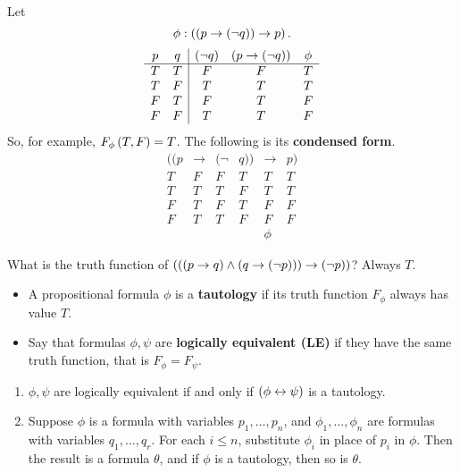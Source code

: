 \begin{example*}
Let
$$ \phi : \left( \left( p \rightarrow \left( \neg q \right) \right) \rightarrow p \right). $$
$$
\begin{array}{cc|ccc}
p & q & \left( \neg q \right) & \left( p \rightarrow \left( \neg q \right) \right) & \phi \\
\hline
T & T & F & F & T \\
T & F & T & T & T \\
F & T & F & T & F \\
F & F & T & T & F
\end{array}
$$
So, for example, $ F_\phi\left( T, F \right) = T $. The following is its \textbf{condensed form}.
$$
\begin{array}{rcrlcl}
((p & \rightarrow & (\neg & q)) & \rightarrow & p) \\
\hline
T & F & F & T & T & T \\
T & T & T & F & T & T \\
F & T & F & T & F & F \\
F & T & T & F & F & F \\
& & & & \phi &
\end{array}
$$
\end{example*}


\begin{example*}
What is the truth function of $ \left( \left( \left( p \rightarrow q \right) \land \left( q \rightarrow \left( \neg p \right) \right) \right) \rightarrow \left( \neg p \right) \right) $? Always $ T $.
\end{example*}

\begin{definition}
\hfill
\begin{itemize}
\item A propositional formula $ \phi $ is a \textbf{tautology} if its truth function $ F_\phi $ always has value $ T $.
\item Say that formulas $ \phi, \psi $ are \textbf{logically equivalent (LE)} if they have the same truth function, that is $ F_\phi = F_\psi $.
\end{itemize}
\end{definition}

\begin{remark}
\label{rem:1.1.5}
\hfill
\begin{enumerate}
\item $ \phi, \psi $ are logically equivalent if and only if $ \left( \phi \leftrightarrow \psi \right) $ is a tautology.
\item Suppose $ \phi $ is a formula with variables $ p_1, \dots, p_n $, and $ \phi_1, \dots, \phi_n $ are formulas with variables $ q_1, \dots, q_r $. For each $ i \le n $, substitute $ \phi_i $ in place of $ p_i $ in $ \phi $. Then the result is a formula $ \theta $, and if $ \phi $ is a tautology, then so is $ \theta $.
\end{enumerate}
\end{remark}

